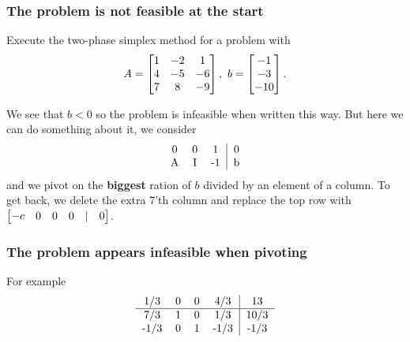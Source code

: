 \documentclass{exam}
\begin{document}
    \subsubsection{The problem is not feasible at the start}
    \begin{question}
        Execute the two-phase simplex method for a problem with
        \[
            A = \matrix{1 & -2 & 1 \\ 4 & -5 & -6 \\ 7 & 8 & -9},\ b=\matrix{-1 \\ -3 \\ -10}.
        \]
    \end{question}
    \begin{answer}
        We see that $b < 0$ so the problem is infeasible when written this way.
        But here we can do something about it, we consider
        \[
            \begin{tabular}{ccc|c}
                0 & 0 & 1 & 0 \\
                A & I & -1 & b \\
            \end{tabular}
        \]
        and we pivot on the \textbf{biggest} ration of $b$ divided by an element of a column.
        To get back, we delete the extra 7'th column and replace the top row with $\matrix{-c & 0 & 0 & 0 &|& 0}$.
    \end{answer}
    \subsubsection{The problem appears infeasible when pivoting}
    For example
    \[
        \begin{tabular}{cccc|c}
            1/3 & 0 & 0 & 4/3 & 13 \\ \hline
            7/3 & 1 & 0 & 1/3 & 10/3 \\
            -1/3 & 0 & 1 & -1/3 & -1/3 \\
        \end{tabular}
    \]
\end{document}

